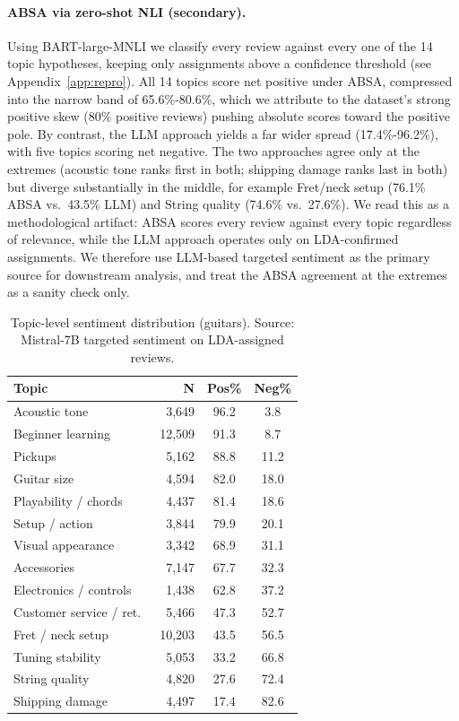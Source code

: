 \documentclass[11pt]{article}
\begin{document}
\paragraph{ABSA via zero-shot NLI (secondary).}
Using BART-large-MNLI we classify every review against every one of
the 14 topic hypotheses, keeping only assignments above a confidence
threshold (see Appendix~\ref{app:repro}).
All 14 topics score net positive under ABSA, compressed into the
narrow band of 65.6\%-80.6\%, which we attribute to the
dataset's strong positive skew (80\% positive reviews) pushing
absolute scores toward the positive pole.
By contrast, the LLM approach yields a far wider spread
(17.4\%-96.2\%), with five topics scoring net negative.
The two approaches agree only at the extremes (acoustic tone ranks
first in both; shipping damage ranks last in both) but diverge
substantially in the middle, for example Fret/neck setup
(76.1\% ABSA vs.\ 43.5\% LLM) and String quality
(74.6\% vs.\ 27.6\%).
We read this as a methodological artifact: ABSA scores every review
against every topic regardless of relevance, while the LLM approach
operates only on LDA-confirmed assignments.
We therefore use LLM-based targeted sentiment as the primary source
for downstream analysis, and treat the ABSA agreement at the extremes
as a sanity check only.

\begin{table}[t]
\centering
\small
\setlength{\tabcolsep}{4pt}
\caption{Topic-level sentiment distribution (guitars).
Source: Mistral-7B targeted sentiment on LDA-assigned reviews.}
\label{tab:topics}
\begin{tabular}{lrcc}
\toprule
\textbf{Topic} & \textbf{N} & \textbf{Pos\%} & \textbf{Neg\%} \\
\midrule
Acoustic tone            & 3{,}649  & 96.2 &  3.8 \\
Beginner learning        & 12{,}509 & 91.3 &  8.7 \\
Pickups                  & 5{,}162  & 88.8 & 11.2 \\
Guitar size              & 4{,}594  & 82.0 & 18.0 \\
Playability / chords     & 4{,}437  & 81.4 & 18.6 \\
Setup / action           & 3{,}844  & 79.9 & 20.1 \\
Visual appearance        & 3{,}342  & 68.9 & 31.1 \\
Accessories              & 7{,}147  & 67.7 & 32.3 \\
Electronics / controls   & 1{,}438  & 62.8 & 37.2 \\
Customer service / ret.\ & 5{,}466  & 47.3 & 52.7 \\
Fret / neck setup        & 10{,}203 & 43.5 & 56.5 \\
Tuning stability         & 5{,}053  & 33.2 & 66.8 \\
String quality           & 4{,}820  & 27.6 & 72.4 \\
Shipping damage          & 4{,}497  & 17.4 & 82.6 \\
\bottomrule
\end{tabular}
\end{table}
\end{document}
